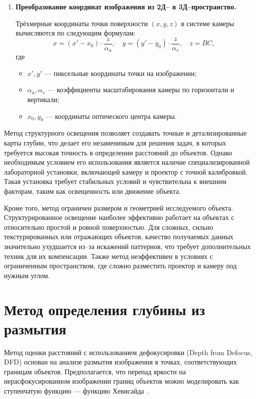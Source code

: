 \begin{enumerate}[label=\arabic*.]
        \item \textbf{Преобразование координат изображения из 2Д-- в \newline 3Д--пространство.}

                Трёхмерные координаты точки поверхности \( (x, y, z) \) в системе камеры вычисляются по следующим формулам:
        \begin{equation}
        x = (x' - x_0) \cdot \frac{z}{\alpha_u}, \quad y = (y' - y_0) \cdot \frac{z}{\alpha_v}, \quad z = BC,
        \label{xyformula}
        \end{equation}
        где
        \begin{itemize}
            \item \( x', y' \) — пиксельные координаты точки на изображении;
            \item \( \alpha_u, \alpha_v \) — коэффициенты масштабирования камеры по горизонтали и вертикали;
            \item \( x_0, y_0 \) — координаты оптического центра камеры.
        \end{itemize}
\end{enumerate}


Метод структурного освещения позволяет создавать точные и детализированные карты глубин,
что делает его незаменимым для решения задач,
в которых требуется высокая точность в определении расстояний до объектов.
Однако необходимым условием его использования является наличие специализированной лабораторной установки,
включающей камеру и проектор с точной калибровкой.
Такая установка требует стабильных условий и чувствительна к внешним факторам,
таким как освещенность или движение объекта.

Кроме того, метод ограничен размером и геометрией исследуемого объекта.
Структурированное освещение наиболее эффективно работает на объектах с относительно простой и ровной поверхностью.
Для сложных, сильно текстурированных или отражающих объектов,
качество получаемых данных значительно ухудшается из--за искажений паттернов,
что требует дополнительных техник для их компенсации.
Также метод неэффективен в условиях с ограниченным пространством,
где сложно разместить проектор и камеру под нужным углом.

\section{Метод определения глубины из размытия}

Метод оценки расстояний с использованием дефокусировки (Depth from Defocus, DFD) основан на анализе размытия изображения в точках, соответствующих границам объектов.
Предполагается, что перепад яркости на нерасфокусированном изображении границ объектов можно моделировать как ступенчатую функцию --- функцию Хевисайда~\cite{hewiside}.

